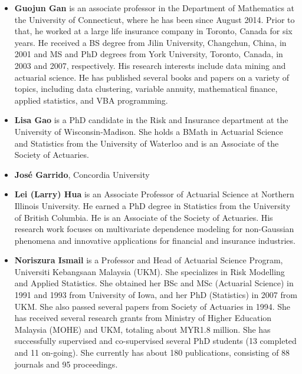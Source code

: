 \documentclass[
]{book}
\providecommand{\tightlist}{%
  \setlength{\itemsep}{0pt}\setlength{\parskip}{0pt}}
\begin{document}
\begin{itemize}
\tightlist
\item
  \textbf{Guojun Gan} is an associate professor in the Department of Mathematics at the University of Connecticut, where he has been since August 2014. Prior to that, he worked at a large life insurance company in Toronto, Canada for six years. He received a BS degree from Jilin University, Changchun, China, in 2001 and MS and PhD degrees from York University, Toronto, Canada, in 2003 and 2007, respectively. His research interests include data mining and actuarial science. He has published several books and papers on a variety of topics, including data clustering, variable annuity, mathematical finance, applied statistics, and VBA programming.
\end{itemize}

\begin{itemize}
\tightlist
\item
  \textbf{Lisa Gao} is a PhD candidate in the Risk and Insurance department at the University of Wisconsin-Madison. She holds a BMath in Actuarial Science and Statistics from the University of Waterloo and is an Associate of the Society of Actuaries.
\end{itemize}

\begin{itemize}
\tightlist
\item
  \textbf{José Garrido}, Concordia University
\end{itemize}

\begin{itemize}
\tightlist
\item
  \textbf{Lei (Larry) Hua} is an Associate Professor of Actuarial Science at Northern Illinois University. He earned a PhD degree in Statistics from the University of British Columbia. He is an Associate of the Society of Actuaries. His research work focuses on multivariate dependence modeling for non-Gaussian phenomena and innovative applications for financial and insurance industries.
\end{itemize}

\begin{itemize}
\tightlist
\item
  \textbf{Noriszura Ismail} is a Professor and Head of Actuarial Science Program, Universiti Kebangsaan Malaysia (UKM). She specializes in Risk Modelling and Applied Statistics. She obtained her BSc and MSc (Actuarial Science) in 1991 and 1993 from University of Iowa, and her PhD (Statistics) in 2007 from UKM. She also passed several papers from Society of Actuaries in 1994. She has received several research grants from Ministry of Higher Education Malaysia (MOHE) and UKM, totaling about MYR1.8 million. She has successfully supervised and co-supervised several PhD students (13 completed and 11 on-going). She currently has about 180 publications, consisting of 88 journals and 95 proceedings.
\end{itemize}
\end{document}
